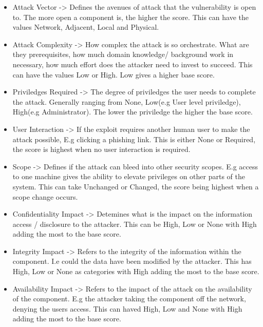 \documentclass[11pt]{article}
\begin{document}
\begin{itemize}

	\begin{itemize}

		\item Attack Vector -> Defines the avenues of attack that the vulnerability is open to. The more open a
		      component is, the higher the score. This can have the values Network, Adjacent, Local and Physical.

		\item Attack Complexity -> How complex the attack is so orchestrate. What are they prerequisites, how much
		      domain knowledge/ background work in necessary, how much effort does the attacker need to invest to
		      succeed. This can have the values Low or High. Low gives a higher base score.

		\item Priviledges Required -> The degree of priviledges the user needs to complete the attack. Generally
		      ranging from None, Low(e.g User level priviledge), High(e.g Administrator). The lower the priviledge
		      the higher the base score.

		\item User Interaction -> If the exploit requires another human user to make the attack possible, E.g
		      clicking a phishing link. This is either None or Required, the score is highest when no user
		      interaction is required.

		\item Scope -> Defines if the attack can bleed into other security scopes. E.g access to one machine gives
		      the ability to elevate privileges on other parts of the system. This can take Unchanged or Changed,
		      the score being highest when a scope change occurs.

		\item Confidentiality Impact -> Detemines what is the impact on the information access / disclosure to the
		      attacker. This can be High, Low or None with High adding the most to the base score.

		\item Integrity Impact -> Refers to the integrity of the information within the component. I.e could the
		      data have been modified by the attacker. This has High, Low or None as categories with High adding the
		      most to the base score.

		\item Availability Impact -> Refers to the impact of the attack on the availability of the component. E.g
		      the attacker taking the component off the network, denying the users access. This can haved High, Low
		      and None with High adding the most to the base score.

	\end{itemize}
\end{itemize}
\end{document}
